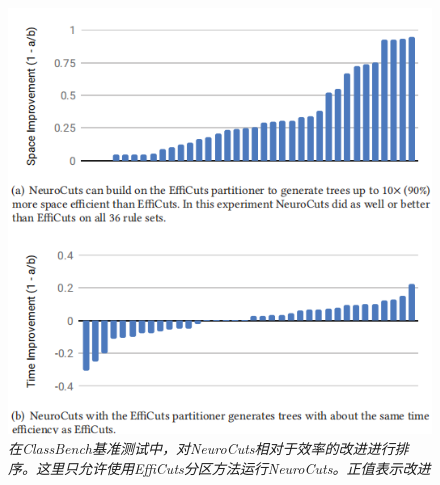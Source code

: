 \documentclass[UTF8,a4paper]{ctexart}
\begin{document}
\begin{figure}[H]
    \centering
    \includegraphics[width = \textwidth]{image015.png}
    \caption{\em 在ClassBench基准测试中，对NeuroCuts相对于效率的改进进行排序。这里只允许使用EffiCuts分区方法运行NeuroCuts。正值表示改进}
    \label{fig:006}
\end{figure}
\end{document}
